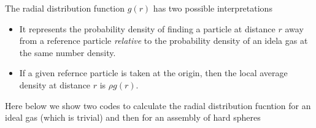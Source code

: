 \documentclass[
  letterpaper,
  enabledeprecatedfontcommands]{report}
\providecommand{\tightlist}{%
  \setlength{\itemsep}{0pt}\setlength{\parskip}{0pt}}
\begin{document}
\begin{tcolorbox}[enhanced jigsaw, leftrule=.75mm, bottomrule=.15mm, colback=white, colframe=quarto-callout-important-color-frame, arc=.35mm, breakable, rightrule=.15mm, left=2mm, opacityback=0, toprule=.15mm]
\begin{minipage}[t]{5.5mm}
\textcolor{quarto-callout-important-color}{\faExclamation}
\end{minipage}%
\begin{minipage}[t]{\textwidth - 5.5mm}

The radial distribution function \(g(r)\) has two possible
interpretations

\begin{itemize}
\tightlist
\item
  It represents the probability density of finding a particle at
  distance \(r\) away from a reference particle \emph{relative} to the
  probability density of an idela gas at the same number density.
\item
  If a given refernce particle is taken at the origin, then the local
  average density at distance \(r\) is \(\rho g(r)\).
\end{itemize}

\end{minipage}%
\end{tcolorbox}

Here below we show two codes to calculate the radial distribution
fucntion for an ideal gas (which is trivial) and then for an assembly of
hard spheres
\end{document}
